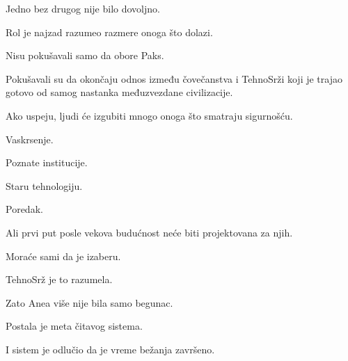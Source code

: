 \bigskip

Jedno bez drugog nije bilo dovoljno.

\bigskip

Rol je najzad razumeo razmere onoga što dolazi.

\bigskip

Nisu pokušavali samo da obore Paks.

\bigskip

Pokušavali su da okončaju odnos između čovečanstva i TehnoSrži koji je trajao gotovo od samog nastanka međuzvezdane civilizacije.

\bigskip

Ako uspeju, ljudi će izgubiti mnogo onoga što smatraju sigurnošću.

\bigskip

Vaskrsenje.

Poznate institucije.

Staru tehnologiju.

Poredak.

\bigskip

Ali prvi put posle vekova budućnost neće biti projektovana za njih.

\bigskip

Moraće sami da je izaberu.

\bigskip

TehnoSrž je to razumela.

\bigskip

Zato Anea više nije bila samo begunac.

\bigskip

Postala je meta čitavog sistema.

\bigskip

I sistem je odlučio da je vreme bežanja završeno.